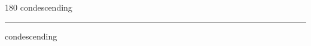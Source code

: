 
\begin{frame}
\begin{center}
\begin{turn}{180}
{\fontsize{2.5cm}{1em}\selectfont condescending}
\end{turn}
\vspace{1em}\par  
\hrule
\vspace{1em}\par  
{\fontsize{2.5cm}{1em}\selectfont condescending}
\end{center}
\end{frame}
